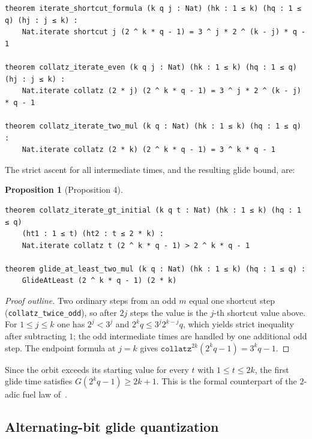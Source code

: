 \documentclass[11pt,a4paper]{article}
\newtheorem{proposition}[theorem]{Proposition}
\begin{document}
\begin{lstlisting}
theorem iterate_shortcut_formula (k q j : Nat) (hk : 1 ≤ k) (hq : 1 ≤ q) (hj : j ≤ k) :
    Nat.iterate shortcut j (2 ^ k * q - 1) = 3 ^ j * 2 ^ (k - j) * q - 1

theorem collatz_iterate_even (k q j : Nat) (hk : 1 ≤ k) (hq : 1 ≤ q) (hj : j ≤ k) :
    Nat.iterate collatz (2 * j) (2 ^ k * q - 1) = 3 ^ j * 2 ^ (k - j) * q - 1

theorem collatz_iterate_two_mul (k q : Nat) (hk : 1 ≤ k) (hq : 1 ≤ q) :
    Nat.iterate collatz (2 * k) (2 ^ k * q - 1) = 3 ^ k * q - 1
\end{lstlisting}

\noindent The strict ascent for all intermediate times, and the resulting glide
bound, are:

\begin{proposition}[Proposition 4]
\label{thm:fuel}
\leavevmode\par\vspace{0.3em}
\begin{lstlisting}
theorem collatz_iterate_gt_initial (k q t : Nat) (hk : 1 ≤ k) (hq : 1 ≤ q)
    (ht1 : 1 ≤ t) (ht2 : t ≤ 2 * k) :
    Nat.iterate collatz t (2 ^ k * q - 1) > 2 ^ k * q - 1

theorem glide_at_least_two_mul (k q : Nat) (hk : 1 ≤ k) (hq : 1 ≤ q) :
    GlideAtLeast (2 ^ k * q - 1) (2 * k)
\end{lstlisting}
\end{proposition}

\begin{proof}[Proof outline]
Two ordinary steps from an odd $m$ equal one shortcut step
(\texttt{collatz\_twice\_odd}), so after $2j$ steps the value is the $j$-th
shortcut value above.  For $1\le j\le k$ one has $2^{j}<3^{j}$ and
$2^{k}q\le 3^{j}2^{k-j}q$, which yields strict inequality after subtracting $1$;
the odd intermediate times are handled by one additional odd step.  The endpoint
formula at $j=k$ gives $\texttt{collatz}^{2k}(2^{k}q-1)=3^{k}q-1$.
\end{proof}

Since the orbit exceeds its starting value for every $t$ with $1\le t\le 2k$,
the first glide time satisfies $G(2^{k}q-1)\ge 2k+1$.  This is the formal
counterpart of the $2$-adic fuel law of~\cite{paper2}.

\subsection{Alternating-bit glide quantization}
\end{document}
